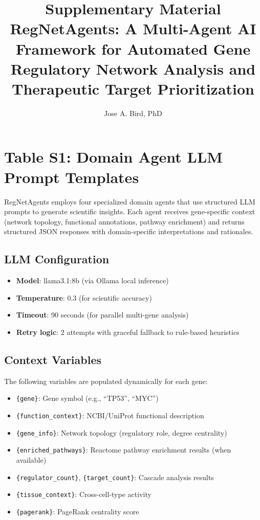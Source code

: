 \documentclass[11pt]{article}
\title{Supplementary Material\\
RegNetAgents: A Multi-Agent AI Framework for Automated Gene Regulatory Network Analysis and Therapeutic Target Prioritization}
\author[1]{Jose A. Bird, PhD}
\affil[1]{Bird AI Solutions}
\date{}
\begin{document}
\maketitle

\tableofcontents

\newpage

\section{Table S1: Domain Agent LLM Prompt Templates}

RegNetAgents employs four specialized domain agents that use structured LLM prompts to generate scientific insights. Each agent receives gene-specific context (network topology, functional annotations, pathway enrichment) and returns structured JSON responses with domain-specific interpretations and rationales.

\subsection{LLM Configuration}

\begin{itemize}
\item \textbf{Model}: llama3.1:8b (via Ollama local inference)
\item \textbf{Temperature}: 0.3 (for scientific accuracy)
\item \textbf{Timeout}: 90 seconds (for parallel multi-gene analysis)
\item \textbf{Retry logic}: 2 attempts with graceful fallback to rule-based heuristics
\end{itemize}

\subsection{Context Variables}

The following variables are populated dynamically for each gene:

\begin{itemize}
\item \texttt{\{gene\}}: Gene symbol (e.g., ``TP53'', ``MYC'')
\item \texttt{\{function\_context\}}: NCBI/UniProt functional description
\item \texttt{\{gene\_info\}}: Network topology (regulatory role, degree centrality)
\item \texttt{\{enriched\_pathways\}}: Reactome pathway enrichment results (when available)
\item \texttt{\{regulator\_count\}}, \texttt{\{target\_count\}}: Cascade analysis results
\item \texttt{\{tissue\_context\}}: Cross-cell-type activity
\item \texttt{\{pagerank\}}: PageRank centrality score
\end{itemize}
\end{document}
